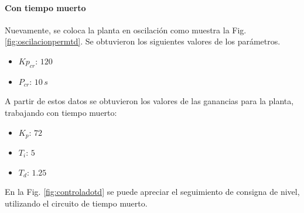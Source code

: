 \paragraph{Con tiempo muerto}

Nuevamente, se coloca la planta en oscilación como muestra la Fig.
\ref{fig:oscilacionpermtd}.
Se obtuvieron los siguientes valores de los parámetros.


\begin{itemize}
 \item $Kp_{cr}$:
 $120$
 \item $P_{cr}$:
 $10\,s$
\end{itemize}

A partir de estos datos se obtuvieron los valores de las ganancias
para la planta, trabajando con tiempo muerto:

\begin{itemize}
 \item $K_p $: $72$
 \item $T_i $: $5$
 \item $T_d $: $1.25$
\end{itemize}

En la Fig. \ref{fig:controladotd} se puede apreciar el seguimiento de consigna
de nivel, utilizando el circuito de tiempo muerto.


